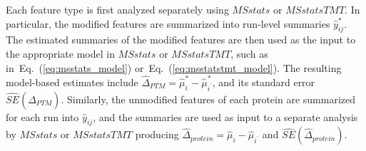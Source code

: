 \documentclass[mcp]{article}
\numberwithin{table}{section}
\def\eqref#1{Eq.~(\ref{eq:#1})}
\begin{document}
Each feature type is first analyzed separately using $MSstats$ or $MSstatsTMT$. In particular, the modified features are summarized into run-level summaries $\hat{y}_{ij}^{\ast}$. The estimated summaries of the modified features are then used as the input to the appropriate model in $MSstats$ or $MSstatsTMT$,  such as in~\eqref{msstats_model} or~\eqref{msstatstmt_model}. The resulting model-based estimates include $\hat{\Delta}_{PTM}=\hat{\mu}^{\ast}_{i}-\hat{\mu}_{i^{\prime}}^{\ast}$, and its standard error $\widehat{SE}(\hat{\Delta}_{PTM})$. Similarly, the unmodified features of each protein are summarized for each run into $\hat{y}_{ij}$, and the summaries are used as input to a separate analysis by $MSstats$ or $MSstatsTMT$ producing $\hat{\Delta}_{protein}=\hat{\mu}_{i}-\hat{\mu}_{i^{\prime}}$ and $\widehat{SE}(\hat{\Delta}_{protein})$. 
\end{document}

